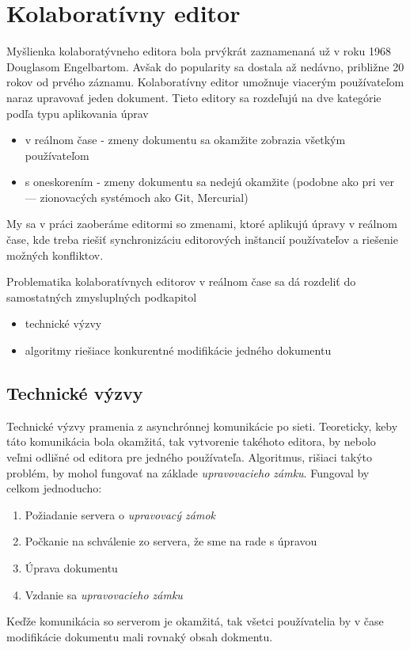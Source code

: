 \chapter{Kolaboratívny editor}

\label{kap:zdialtelnost} %

Myšlienka kolaboratývneho editora bola prvýkrát zaznamenaná už v roku 1968 Douglasom Engelbartom. 
Avšak do popularity sa dostala až nedávno, približne 20 rokov od prvého záznamu.
Kolaboratívny editor umožnuje viacerým používateľom naraz upravovať jeden dokument.
Tieto editory sa rozdeľujú na dve kategórie podľa typu aplikovania úprav
\begin{itemize}
  \item v reálnom čase - zmeny dokumentu sa okamžite zobrazia všetkým používateľom
  \item s oneskorením - zmeny dokumentu sa nedejú okamžite (podobne ako pri ver --- zionovacých
  systémoch ako Git, Mercurial)
\end{itemize}
My sa v práci zaoberáme editormi so zmenami, ktoré aplikujú úpravy v reálnom čase, kde treba
riešiť synchronizáciu editorových inštancií používateľov a riešenie možných konfliktov.

Problematika kolaboratívnych editorov v reálnom čase sa dá rozdeliť do samostatných zmysluplných 
podkapitol
\begin{itemize}
\item  technické výzvy
\item  algoritmy riešiace konkurentné modifikácie jedného dokumentu
\end{itemize}

\section{Technické výzvy}
Technické výzvy pramenia z asynchrónnej komunikácie po sieti. Teoreticky, keby táto 
komunikácia bola okamžitá, tak vytvorenie takéhoto editora, by nebolo veľmi odlišné od
editora pre jedného používateľa. Algoritmus\label{algo:nesubezne_editovanie}, 
rišiaci takýto problém, by mohol fungovať na základe 
\textit{upravovacieho zámku}. Fungoval by celkom jednoducho:
\begin{enumerate}
  \item Požiadanie servera o \textit{upravovacý zámok}
  \item Počkanie na schválenie zo servera, že sme na rade s úpravou
  \item Úprava dokumentu
  \item Vzdanie sa \textit{upravovacieho zámku}
\end{enumerate}
Keďže komunikácia so serverom je okamžitá, tak všetci používatelia by v čase modifikácie
dokumentu mali rovnaký obsah dokmentu. 

